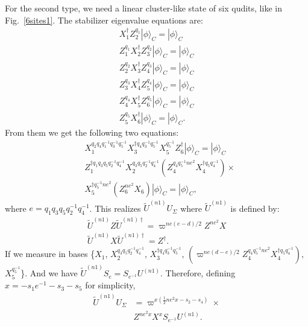 \documentclass[aps,amsfonts,pra,twocolumn,showpacs]{revtex4-1}
\begin{document}
	For the second type, we need a linear cluster-like state of six qudits, like in Fig.~\ref{6sites1}. The stabilizer eigenvalue equations are:
		\begin{align}
		X_1^\dagger Z_2^{q_1} |\phi\rangle_C = |\phi\rangle_C \\
		Z_1^{q_1} X_2^\dagger Z_3^{q_2} |\phi\rangle_C = |\phi\rangle_C \\
		Z_2^{q_2} X_3^\dagger Z_4^{q_3} |\phi\rangle_C = |\phi\rangle_C \\
		Z_3^{q_3} X_4^\dagger Z_5^{q_4} |\phi\rangle_C = |\phi\rangle_C \\
		Z_4^{q_4} X_5^\dagger Z_6^{q_5} |\phi\rangle_C = |\phi\rangle_C \\
		Z_5^{q_5} X_6^\dagger |\phi\rangle_C = |\phi\rangle_C.
		\end{align}
	From them we get the following two equations:
		\begin{align}
		& X_1^{q_2q_4q_1^{-1}q_3^{-1}q_5^{-1}} X_3^{\dagger q_4q_3^{-1}q_5^{-1}} X_5^{q_5^{-1}} Z_6^\dagger |\phi\rangle_C = |\phi\rangle_C \\
		& Z_1^{\dagger q_1q_3q_5q_2^{-1}q_4^{-1}} X_2^{q_3q_5q_2^{-1}q_4^{-1}} (Z_4^{q_4q_5^{-1}ne^2}X_4^{\dagger q_5q_4^{-1}}) \times \nonumber \\
			& X_5^{\dagger q_5^{-1}ne^2} (Z_6^{ne^2} X_6) |\phi\rangle_C = |\phi\rangle_C,
		\end{align}
	where $e=q_1q_3q_5q_2^{-1}q_4^{-1}$. This realizes $\tilde{U}^{(n1)} U_\Sigma$ where $\tilde{U}^{(n1)}$ is defined by:
		\begin{align}
		\tilde{U}^{(n1)} Z \tilde{U}^{(n1)\dagger} = \varpi^{ne(e-d)/2} Z^{ne^2} X \\
		\tilde{U}^{(n1)} X \tilde{U}^{(n1)\dagger} = Z^\dagger.
		\end{align}
	If we measure in bases \{$X_1$, $X_2^{q_3q_5q_2^{-1}q_4^{-1}}$, $X_3^{\dagger q_4q_3^{-1}q_5^{-1}}$, $(\varpi^{ne(d-e)/2}Z_4^{q_4q_5^{-1}ne^2}X_4^{\dagger q_5q_4^{-1}})$, $X_5^{q_5^{-1}}$\}. And we have $\tilde{U}^{(n1)}S_e=S_{e^{-1}} U^{(n1)}$. Therefore, defining $x=-s_1e^{-1}-s_3-s_5$ for simplicity,
		\begin{align}
		\tilde{U}^{(n1)} U_\Sigma & = \varpi^{x(\frac{1}{2}ne^2x-s_2-s_4)} \times \nonumber \\
			& Z^{ne^2x} X^x S_{e^{-1}} U^{(n1)}.
		\end{align}
	
\end{document}
